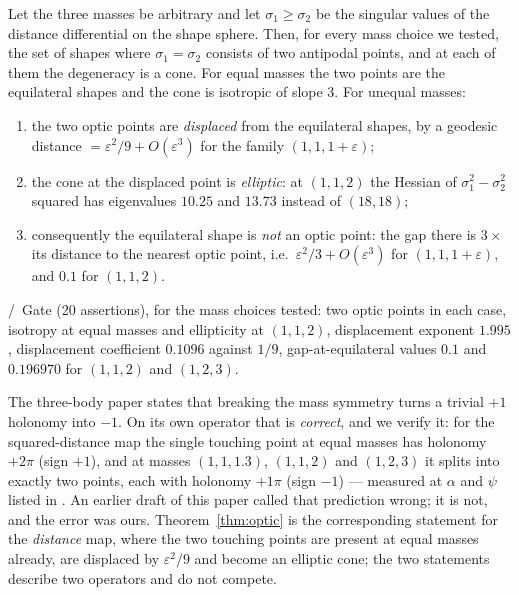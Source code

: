 \begin{theorem}\label{thm:optic}
Let the three masses be arbitrary and let $\sigma_1\ge\sigma_2$ be the singular values of the
distance differential on the shape sphere. Then, for every mass choice we tested, the set of
shapes where $\sigma_1=\sigma_2$ consists of two antipodal points, and at each of them the
degeneracy is a cone. For equal masses the two points are the equilateral shapes and the cone is isotropic
of slope $3$. For unequal masses:
\begin{enumerate}[label=(\roman*)]
\item the two optic points are \emph{displaced} from the equilateral shapes, by a geodesic
distance $=\varepsilon^2/9+O(\varepsilon^3)$ for the family $(1,1,1+\varepsilon)$;
\item the cone at the displaced point is \emph{elliptic}: at $(1,1,2)$ the Hessian of
$\sigma_1^2-\sigma_2^2$ squared has eigenvalues $10.25$ and $13.73$ instead of $(18,18)$;
\item consequently the equilateral shape is \emph{not} an optic point: the gap there is
$3\times$ its distance to the nearest optic point, i.e.\ $\varepsilon^2/3+O(\varepsilon^3)$
for $(1,1,1+\varepsilon)$, and $0.1$ for $(1,1,2)$.
\end{enumerate}
\T/\V\ Gate  (20 assertions), for the mass choices tested: two optic
points in each case, isotropy at equal masses and ellipticity at $(1,1,2)$, displacement exponent $1.995$, displacement
coefficient $0.1096$ against $1/9$, gap-at-equilateral values $0.1$ and $0.196970$ for
$(1,1,2)$ and $(1,2,3)$.
\end{theorem}

\begin{remark}\label{rem:biaxial}
The three-body paper states that breaking the mass symmetry turns a trivial $+1$ holonomy into
$-1$. On its own operator that is \emph{correct}, and we verify it: for the squared-distance map
the single touching point at equal masses has holonomy $+2\pi$ (sign $+1$), and at masses
$(1,1,1.3)$, $(1,1,2)$ and $(1,2,3)$ it splits into exactly two points, each with holonomy $+1\pi$
(sign $-1$) --- measured at $\alpha$ and $\psi$ listed in . An
earlier draft of this paper called that prediction wrong; it is not, and the error was ours.
Theorem~\ref{thm:optic} is the corresponding statement for the \emph{distance} map, where the two
touching points are present at equal masses already, are displaced by $\varepsilon^2/9$ and become
an elliptic cone; the two statements describe two operators and do not compete.
\end{remark}
